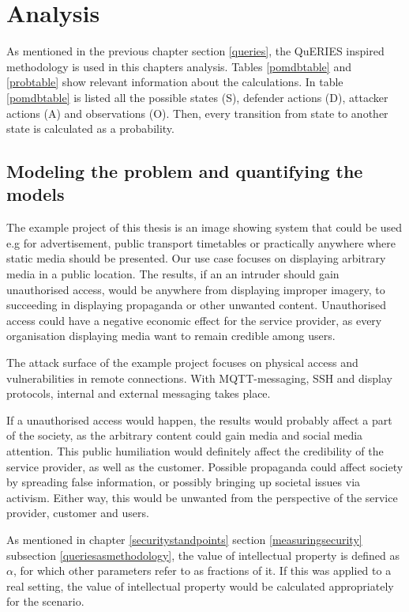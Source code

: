 \chapter{Analysis} \label{analysis}

As mentioned in the previous chapter section \ref{queries}, the
QuERIES inspired methodology is used in this chapters analysis. Tables
\ref{pomdbtable} and \ref{probtable} show relevant information about
the calculations. In table \ref{pomdbtable} is listed all the possible
states (S), defender actions (D), attacker actions (A) and
observations (O). Then, every transition from state to another state
is calculated as a probability. 

\section{Modeling the problem and quantifying the models} \label{modprob}

The example project of this thesis is an image showing system that
could be used e.g for advertisement, public transport timetables or
practically anywhere where static media should be presented. Our use
case focuses on displaying arbitrary media in a public location. The
results, if an an intruder should gain unauthorised access, would be
anywhere from displaying improper imagery, to succeeding in displaying
propaganda or other unwanted content. Unauthorised access could have a
negative economic effect for the service provider, as every
organisation displaying media want to remain credible among users.

The attack surface of the example project focuses on physical access
and vulnerabilities in remote connections. With MQTT-messaging, SSH
and display protocols, internal and external messaging takes place.

If a unauthorised access would happen, the results would probably
affect a part of the society, as the arbitrary content could gain
media and social media attention. This public humiliation would
definitely affect the credibility of the service provider, as well as
the customer. Possible propaganda could affect society by spreading
false information, or possibly bringing up societal issues via
activism. Either way, this would be unwanted from the perspective of
the service provider, customer and users.

As mentioned in chapter \ref{securitystandpoints} section
\ref{measuringsecurity} subsection \ref{queriesasmethodology}, the
value of intellectual property is defined as $\alpha$, for which other
parameters refer to as fractions of it. If this was applied to a real
setting, the value of intellectual property would be calculated appropriately
for the scenario.

